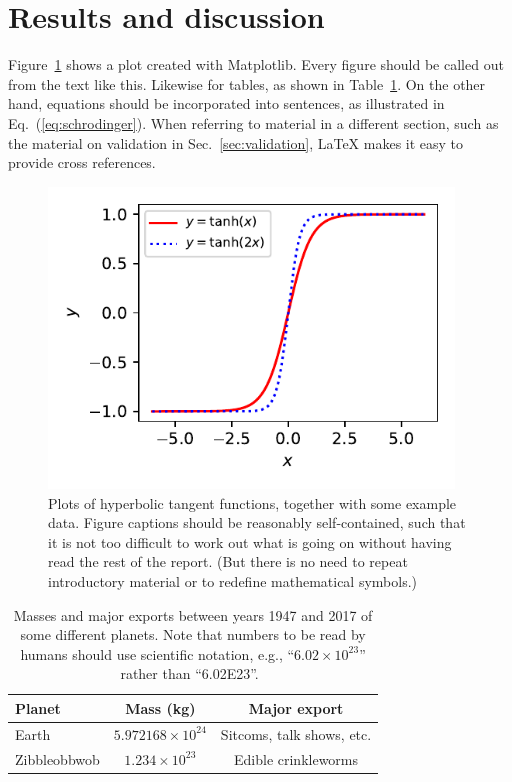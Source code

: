 \documentclass[a4,12pt]{article}
\begin{document}
\section{Results and discussion}

Figure~\ref{fig:example} shows a plot created with Matplotlib.  Every
figure should be called out from the text like this.  Likewise for
tables, as shown in Table~\ref{table:planets}.  On the other hand,
equations should be incorporated into sentences, as illustrated in
Eq.~(\ref{eq:schrodinger}).  When referring to material in a
different section, such as the material on validation in
Sec.~\ref{sec:validation}, LaTeX makes it easy to provide cross
references.

\begin{figure}[!htbp]
\centering
\includegraphics[clip,height=8cm]{tanh.pdf}
\caption{Plots of hyperbolic tangent functions, together with some
  example data.  Figure captions should be reasonably self-contained,
  such that it is not too difficult to work out what is going on
  without having read the rest of the report. (But there is no need to
  repeat introductory material or to redefine mathematical
  symbols.)~\label{fig:example}}
\end{figure}

\begin{table}[!htbp]
\centering

\caption{Masses and major exports between years 1947 and 2017 of some
  different planets. Note that numbers to be read by humans should use
  scientific notation, e.g., ``$6.02 \times 10^{23}$'' rather than
  ``6.02E23''.~\label{table:planets}}

\begin{tabular}{lcc}
\hline \hline

Planet & Mass (kg) & Major export \\

\hline

Earth & $5.972168 \times 10^{24}$ & Sitcoms, talk shows, etc. \\

Zibbleobbwob & $1.234 \times 10^{23}$ & Edible crinkleworms \\

\hline \hline
\end{tabular}

\end{table}
\end{document}

